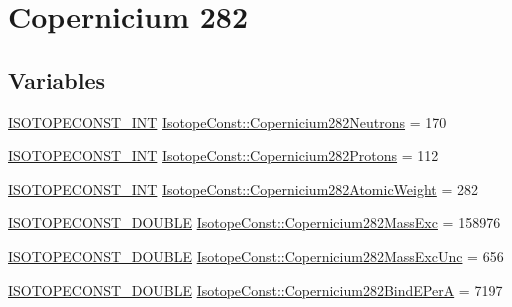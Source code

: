 \hypertarget{group___isotope_const-_copernicium-_cn282}{}\section{Copernicium 282}
\label{group___isotope_const-_copernicium-_cn282}
\subsection*{Variables}
\begin{DoxyCompactItemize}
\item 
\mbox{\hyperlink{group___isotope_const-_macros_ga5f18360b3e99483a35c32d789e62621c}{I\+S\+O\+T\+O\+P\+E\+C\+O\+N\+S\+T\+\_\+\+I\+NT}} \mbox{\hyperlink{group___isotope_const-_copernicium-_cn282_ga295d1334bd7e6d8c7b25e6a3866600a7}{Isotope\+Const\+::\+Copernicium282\+Neutrons}} = 170
\item 
\mbox{\hyperlink{group___isotope_const-_macros_ga5f18360b3e99483a35c32d789e62621c}{I\+S\+O\+T\+O\+P\+E\+C\+O\+N\+S\+T\+\_\+\+I\+NT}} \mbox{\hyperlink{group___isotope_const-_copernicium-_cn282_ga651f00d51cb7caeb6cb51562510e4682}{Isotope\+Const\+::\+Copernicium282\+Protons}} = 112
\item 
\mbox{\hyperlink{group___isotope_const-_macros_ga5f18360b3e99483a35c32d789e62621c}{I\+S\+O\+T\+O\+P\+E\+C\+O\+N\+S\+T\+\_\+\+I\+NT}} \mbox{\hyperlink{group___isotope_const-_copernicium-_cn282_gab3039425da37e49a09f02d7b37d89286}{Isotope\+Const\+::\+Copernicium282\+Atomic\+Weight}} = 282
\item 
\mbox{\hyperlink{group___isotope_const-_macros_ga8f45a7272ce02c0b4c65c44636ed719a}{I\+S\+O\+T\+O\+P\+E\+C\+O\+N\+S\+T\+\_\+\+D\+O\+U\+B\+LE}} \mbox{\hyperlink{group___isotope_const-_copernicium-_cn282_ga7fd83a010c7162571297432198e2bd6f}{Isotope\+Const\+::\+Copernicium282\+Mass\+Exc}} = 158976
\item 
\mbox{\hyperlink{group___isotope_const-_macros_ga8f45a7272ce02c0b4c65c44636ed719a}{I\+S\+O\+T\+O\+P\+E\+C\+O\+N\+S\+T\+\_\+\+D\+O\+U\+B\+LE}} \mbox{\hyperlink{group___isotope_const-_copernicium-_cn282_ga78180743801980b0534af744695ce74c}{Isotope\+Const\+::\+Copernicium282\+Mass\+Exc\+Unc}} = 656
\item 
\mbox{\hyperlink{group___isotope_const-_macros_ga8f45a7272ce02c0b4c65c44636ed719a}{I\+S\+O\+T\+O\+P\+E\+C\+O\+N\+S\+T\+\_\+\+D\+O\+U\+B\+LE}} \mbox{\hyperlink{group___isotope_const-_copernicium-_cn282_ga5c492859d2270b4bc5a5016104327f78}{Isotope\+Const\+::\+Copernicium282\+Bind\+E\+PerA}} = 7197

\end{DoxyCompactItemize}
